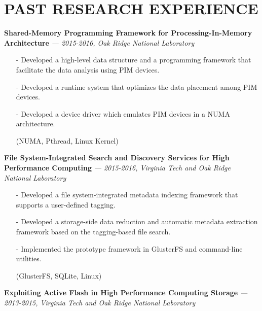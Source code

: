 \section{PAST RESEARCH EXPERIENCE} 
\vspace{0.03in}
  {\bf Shared-Memory Programming Framework for Processing-In-Memory Architecture}
   {\it \footnotesize --- 2015-2016, Oak Ridge National Laboratory}
   \begin{itemize}[leftmargin=*]
    \setlength\itemsep{-0.02in}
    \item[-] Developed a high-level data structure and a programming framework that
             facilitate the data analysis using PIM devices.
    \item[-] Developed a runtime system that optimizes the data placement among PIM devices.
    \item[-] Developed a device driver which emulates PIM devices in a NUMA architecture.
    \item[] {\small(NUMA, Pthread, Linux Kernel)}
   \end{itemize}
  \vspace{-0.15in}
  {\bf File System-Integrated Search and Discovery Services for High Performance Computing}
   {\it \footnotesize --- 2015-2016, Virginia Tech and Oak Ridge National Laboratory}
   \begin{itemize}[leftmargin=*]
    \setlength\itemsep{-0.02in}
    \item[-] Developed a file system-integrated metadata indexing framework
	     that supports a user-defined tagging.
    \item[-] Developed a storage-side data reduction and automatic metadata
	     extraction framework based on the tagging-based file search.
    \item[-] Implemented the prototype framework in GlusterFS and command-line utilities.
    \item[] {\small(GlusterFS, SQLite, Linux)}
   \end{itemize}
  \vspace{-0.15in}
  {\bf Exploiting Active Flash in High Performance Computing Storage}
    {\it \footnotesize --- 2013-2015, Virginia Tech and Oak Ridge National Laboratory}
